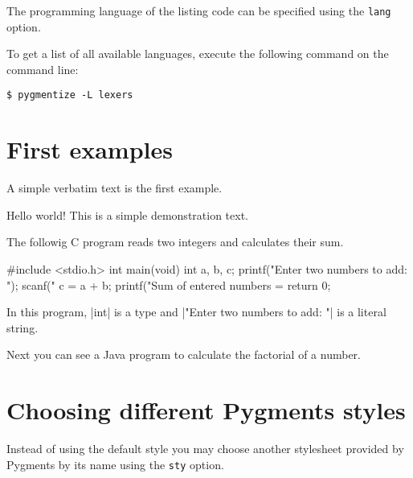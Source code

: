 \documentclass[10pt,a4paper]{article}
\begin{document}
The programming language of the listing code can be specified using the
\verb|lang| option.

To get a list of all available languages, execute the following command
on the command line:
\begin{verbatim}
$ pygmentize -L lexers
\end{verbatim}

\section{First examples}

A simple verbatim text is the first example.

\begin{Example}
\begin{pygmented}[]
Hello world!
  This is a simple demonstration text.
\end{pygmented}
\end{Example}

The followig C program reads two integers and calculates their sum.

\begin{Example}
\begin{pygmented}[lang=c]
#include <stdio.h>
int main(void)
{
   int a, b, c;
   printf("Enter two numbers to add: ");
   scanf("%
   c = a + b;
   printf("Sum of entered numbers = %
   return 0;
}
\end{pygmented}
\end{Example}

\begin{Example}
  In this program, \pyginline[lang=c]|int| is a type and
  \pyginline[lang=c]|"Enter two numbers to add: "| is a literal string.
\end{Example}

Next you can see a Java program to calculate the factorial of a number.

\begin{Example}
\end{Example}

\section{Choosing different Pygments styles}

Instead of using the default style you may choose another stylesheet
provided by Pygments by its name using the \verb|sty| option.
\end{document}
